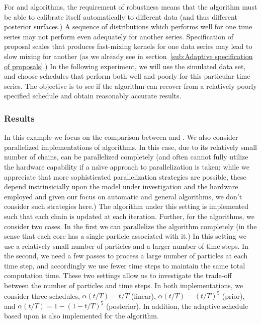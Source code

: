 For \smc and \pmcmc algorithms, the requirement of robustness means that the
algorithm must be able to calibrate itself automatically to different data
(and thus different posterior surfaces.) A sequence of distributions which
performs well for one time series may not perform even adequately for another
series. Specification of proposal scales that produces fast-mixing kernels for
one data series may lead to slow mixing for another (as we already see in
section~\ref{sub:Adaptive specification of proposals}.) In the following
experiment, we will use the simulated data set, and choose schedules that
perform both well and poorly for this particular time series. The objective is
to see if the algorithm can recover from a relatively poorly specified
schedule and obtain reasonably accurate results.

\subsubsection{Results}

In this example we focus on the comparison between \smc[2] and \pmcmc. We also
consider parallelized implementations of algorithms. In this case, due to its
relatively small number of chains, \pmcmc can be parallelized completely (and
often cannot fully utilize the hardware capability if a na\"\i ve approach to
parallelization is taken; while we appreciate that more sophisticated
parallelization strategies are possible, these depend instrinsicially upon the
model under investigation and the hardware employed and given our focus on
automatic and general algorithms, we don't consider such strategies here.) The
\pmcmc algorithm under this setting is implemented such that each chain is
updated at each iteration. Further, for the \smc algorithms, we consider two
cases. In the first we can parallelize the algorithm completely (in the sense
that each core has a single particle associated with it.) In this setting we
use a relatively small number of particles and a larger number of time steps.
In the second, we need a few passes to process a large number of particles at
each time step, and accordingly we use fewer time steps to maintain the same
total computation time. These two settings allow us to investigate the
trade-off between the number of particles and time steps. In both
implementations, we consider three schedules, $\alpha(t/T) = t/T$ (linear),
$\alpha(t/T) = (t/T)^5$ (prior), and $\alpha(t/T) = 1 - (1 - t/T)^5$
(posterior). In addition, the adaptive schedule based upon \cess is also
implemented for the \smc[2] algorithm.

